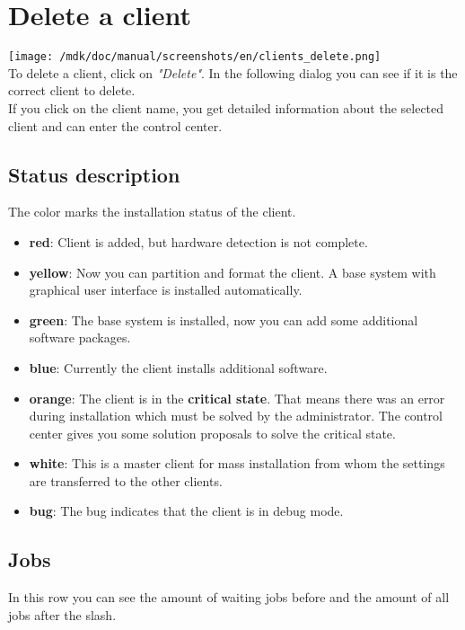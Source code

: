 \section{Delete a client}
\texttt{[image: /mdk/doc/manual/screenshots/en/clients\_delete.png]} \\
To delete a client, click on \textit{"Delete"}. In the following dialog you can see if it is the correct client to delete.\\
If you click on the client name, you get detailed information about the selected client and can enter the control center.\\
\subsection{Status description}
The color marks the installation status of the client.\\
\begin{itemize}
\item \textbf{red}: Client is added, but hardware detection is not complete.\\
\item \textbf{yellow}: Now you can partition and format the client. A base system with graphical user interface is installed automatically.\\
\item \textbf{green}: The base system is installed, now you can add some additional software packages.\\
\item \textbf{blue}: Currently the client installs additional software.\\
\item \textbf{orange}: The client is in the \textbf{critical state}. That means there was an error during installation which must be solved by the administrator. The control center gives you some solution proposals to solve the critical state.\\
\item \textbf{white}: This is a master client for mass installation from whom the settings are transferred to the other clients.\\
\item \textbf{bug}: The bug indicates that the client is in debug mode.\\
\end{itemize}
\subsection{Jobs}
In this row you can see the amount of waiting jobs before and the amount of all jobs after the slash.\\
